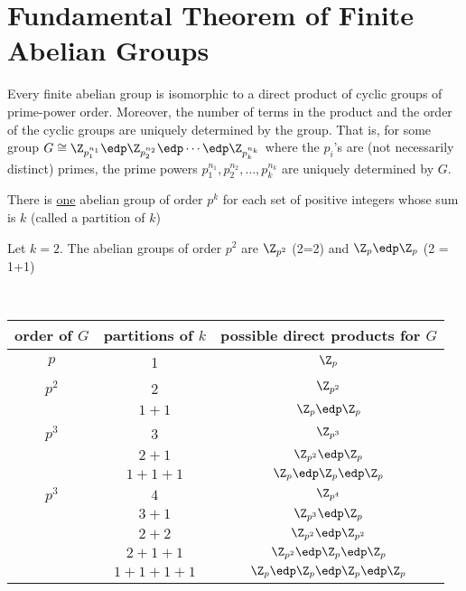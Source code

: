 \section{Fundamental Theorem of Finite Abelian Groups}

\begin{theorem}
    Every finite abelian group is isomorphic to a direct product of cyclic groups of prime-power order. Moreover, the number of terms in the product and the order of the cyclic groups are uniquely determined by the group. That is, for some group \(G\cong \Z_{p_1^{n_1}}\edp \Z_{p_2^{n_2}}\edp\cdots\edp \Z_{p_k^{n_k}}\) where the \(p_i\)'s are (not necessarily distinct) primes, the prime powers \(p_1^{n_1},p_2^{n_2},\ldots,p_k^{n_k}\) are uniquely determined by \(G\).
\end{theorem}


\begin{theorem}
    There is \ul{one} abelian group of order \(p^k\) for each set of positive integers whose sum is \(k\) (called a partition of \(k\))
\end{theorem}

\begin{example}
    Let \(k=2\). The abelian groups of order \(p^2\) are \(\Z_{p^2}\) (2=2) and \(\Z_p\edp\Z_p\) (2 = 1+1)
\end{example}

\begin{example} \
\begin{center}
    \begin{tabular}{|c|c|c|}
        \hline
        order of \(G\)  & partitions of \(k\)   & possible direct products for \(G\) \\ \hline
        \(p\)           & 1                     & \(\Z_{p}\)              \\ \hline
        \(p^2\)         & 2                     & \(\Z_{p^2}\)            \\
                        & $1 + 1$               & \(\Z_{p}\edp\Z_{p}\)  \\ \hline
        \(p^3\)         & 3                     & \(\Z_{p^3}\) \\
                        & $2 + 1$           &  \(\Z_{p^2}\edp \Z_{p}\) \\
                        & \(1+1+1\)         & \(\Z_{p}\edp \Z_{p}\edp \Z_{p}\) \\ \hline
        \(p^3\)         & \(4\)             & \(\Z_{p^4}\) \\
                        & $3 + 1$           &  \(\Z_{p^3}\edp \Z_{p}\) \\
                        & $2 + 2$           &  \(\Z_{p^2}\edp \Z_{p^2}\) \\
                        & $2 + 1 + 1$       &  \(\Z_{p^2}\edp \Z_{p}\edp \Z_p\) \\
                        & \(1+1+1+1\)         & \(\Z_{p}\edp \Z_{p}\edp \Z_{p}\edp \Z_p\) \\ \hline
    \end{tabular}
\end{center}
\end{example}

